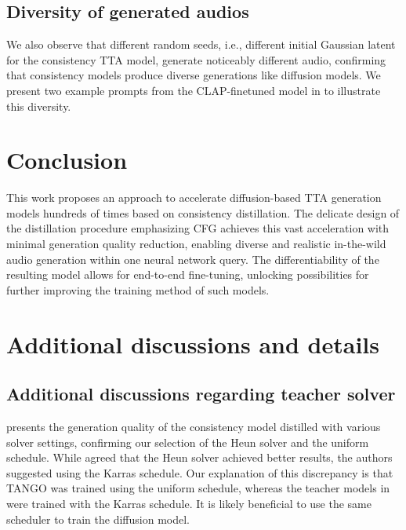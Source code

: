 \documentclass{article}
\begin{document}
\subsection{Diversity of generated audios}

We also observe that different random seeds, i.e., different initial Gaussian latent for the consistency TTA model, generate noticeably different audio, confirming that consistency models produce diverse generations like diffusion models. We present two example prompts from the CLAP-finetuned model in  to illustrate this diversity.



\section{Conclusion}

This work proposes an approach to accelerate diffusion-based TTA generation models hundreds of times based on consistency distillation. The delicate design of the distillation procedure emphasizing CFG achieves this vast acceleration with minimal generation quality reduction, enabling diverse and realistic in-the-wild audio generation within one neural network query. The differentiability of the resulting model allows for end-to-end fine-tuning, unlocking possibilities for further improving the training method of such models.


\newpage




\appendix
\onecolumn
\newpage


\section{Additional discussions and details} \label{sec:exp_details}

\subsection{Additional discussions regarding teacher solver} \label{sec:solver_discuss}

 presents the generation quality of the consistency model  distilled with various solver settings, confirming our selection of the Heun solver and the uniform schedule. While \cite{cm} agreed that the Heun solver achieved better results, the authors suggested using the Karras schedule. Our explanation of this discrepancy is that TANGO was trained using the uniform schedule, whereas the teacher models in \cite{cm} were trained with the Karras schedule. It is likely beneficial to use the same scheduler to train the diffusion model.
\end{document}
